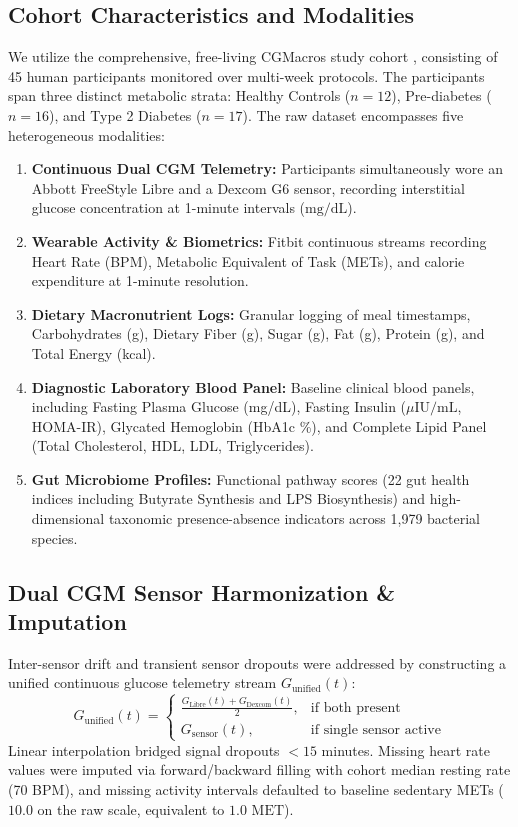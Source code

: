 \documentclass[conference]{IEEEtran}
\begin{document}
\subsection{Cohort Characteristics and Modalities}
We utilize the comprehensive, free-living CGMacros study cohort \cite{mendes2024cgmacros}, consisting of 45 human participants monitored over multi-week protocols. The participants span three distinct metabolic strata: Healthy Controls ($n=12$), Pre-diabetes ($n=16$), and Type 2 Diabetes ($n=17$). The raw dataset encompasses five heterogeneous modalities:
\begin{enumerate}
    \item \textbf{Continuous Dual CGM Telemetry:} Participants simultaneously wore an Abbott FreeStyle Libre and a Dexcom G6 sensor, recording interstitial glucose concentration at 1-minute intervals ($\text{mg/dL}$).
    \item \textbf{Wearable Activity \& Biometrics:} Fitbit continuous streams recording Heart Rate (BPM), Metabolic Equivalent of Task (METs), and calorie expenditure at 1-minute resolution.
    \item \textbf{Dietary Macronutrient Logs:} Granular logging of meal timestamps, Carbohydrates (g), Dietary Fiber (g), Sugar (g), Fat (g), Protein (g), and Total Energy (kcal).
    \item \textbf{Diagnostic Laboratory Blood Panel:} Baseline clinical blood panels, including Fasting Plasma Glucose (mg/dL), Fasting Insulin ($\mu\text{IU/mL}$, HOMA-IR), Glycated Hemoglobin (HbA1c \%), and Complete Lipid Panel (Total Cholesterol, HDL, LDL, Triglycerides).
    \item \textbf{Gut Microbiome Profiles:} Functional pathway scores (22 gut health indices including Butyrate Synthesis and LPS Biosynthesis) and high-dimensional taxonomic presence-absence indicators across 1,979 bacterial species.
\end{enumerate}

\subsection{Dual CGM Sensor Harmonization \& Imputation}
Inter-sensor drift and transient sensor dropouts were addressed by constructing a unified continuous glucose telemetry stream $G_{\text{unified}}(t)$:
\begin{equation}
G_{\text{unified}}(t) = 
\begin{cases}
\frac{G_{\text{Libre}}(t) + G_{\text{Dexcom}}(t)}{2}, & \text{if both present} \\
G_{\text{sensor}}(t), & \text{if single sensor active}
\end{cases}
\end{equation}
Linear interpolation bridged signal dropouts $<15$ minutes. Missing heart rate values were imputed via forward/backward filling with cohort median resting rate (70 BPM), and missing activity intervals defaulted to baseline sedentary METs ($10.0$ on the raw scale, equivalent to $1.0\text{ MET}$).
\end{document}
